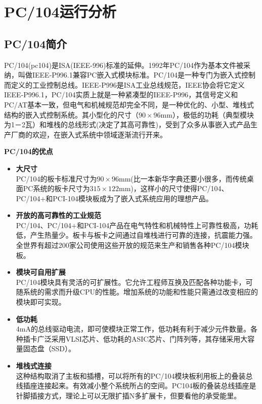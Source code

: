 %
\chapter{PC/104运行分析}
\section{PC/104简介}
PC/104(pc104)是ISA(IEEE-996)标准的延伸。1992年PC/104作为基本文件被采纳，叫做IEEE-P996.1兼容PC嵌入式模块标准。PC/104是一种专门为嵌入式控制而定义的工业控制总线。IEEE-P996是ISA工业总线规范，IEEE协会将它定义IEEE-P996.1，PC/104实质上就是一种紧凑型的IEEE-P996，其信号定义和PC/AT基本一致，但电气和机械规范却完全不同，是一种优化的、小型、堆栈式结构的嵌入式控制系统。其小型化的尺寸（$90\times 96$mm），极低的功耗（典型模块为1－2瓦）和堆栈的总线形式(决定了其高可靠性)，受到了众多从事嵌入式产品生产厂商的欢迎，在嵌入式系统中领域逐渐流行开来。

\textbf{\xiaoer PC/104的优点}
\begin{itemize}
  \item\textbf{\sanhao 大尺寸}\\
    PC/104的板卡标准尺寸为$90\times 96$mm(比一本新华字典还要小很多，而传统桌面PC系统的板卡尺寸为$315\times 122$mm)，这样小的尺寸使得PC/104、PC/104+和PCI-104模块板成为了嵌入式系统应用的理想产品。
  \item\textbf{\sanhao 开放的高可靠性的工业规范}\\ PC/104、PC/104+和PCI-104产品在电气特性和机械特性上可靠性极高，功耗低，产生热量少。板卡与板卡之间通过自堆栈进行可靠的连接，抗震能力强。全世界有超过200家公司使用这些开放的规范来生产和销售各种PC/104模块板。
  \item\textbf{\sanhao 模块可自用扩展}\\ PC/104模块具有灵活的可扩展性。它允许工程师互换及匹配各种功能卡，可随系统的需求而升级CPU的性能。增加系统的功能和性能只需通过改变相应的模块即可实现。
  \item\textbf{\sanhao 低功耗}\\ 4mA的总线驱动电流，即可使模块正常工作，低功耗有利于减少元件数量。各种插卡广泛采用VLSI芯片、低功耗的ASIC芯片、门阵列等，其存储采用大容量固态盘（SSD）。
  \item\textbf{\sanhao 堆栈式连接}\\ 这种结构取消了主板和插槽，可以将所有的PC/104模块板利用板上的叠装总线插座连接起来。有效减小整个系统所占的空间。PC104板的叠装总线插座是针脚插接方式，理论上可以无限扩插N多扩展卡，但要看他的承受能里。
\end{itemize}
